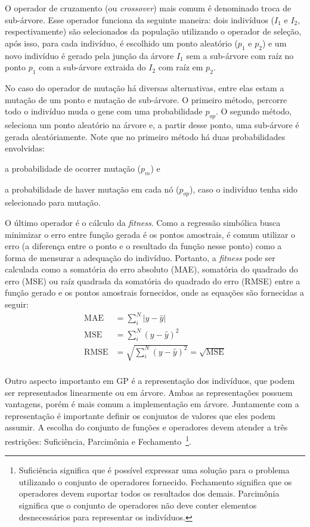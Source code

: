 \documentclass[a4paper]{paper}
\begin{document}
O operador de cruzamento (ou \textit{crossover}) mais comum é denominado troca
de sub-árvore. Esse operador funciona da seguinte maneira: dois indivíduos
($I_1$ e $I_2$, respectivamente) são selecionados da população utilizando o
operador de seleção, após isso, para cada indivíduo, é escolhido um ponto
aleatório ($p_1$ e $p_2$) e um novo indivíduo é gerado pela junção da árvore
$I_1$ sem a sub-árvore com raíz no ponto $p_1$ com a sub-árvore extraida do
$I_2$ com raíz em $p_2$.

No caso do operador de mutação há diversas alternativas, entre elas estam a
mutação de um ponto e mutação de sub-árvore. O primeiro método, percorre todo o
indivíduo muda o gene com uma probabilidade $p_{op}$. O segundo método, seleciona
um ponto aleatório na árvore e, a partir desse ponto, uma sub-árvore é gerada
aleatóriamente. Note que no primeiro método há duas probabilidades envolvidas:
\begin{ilist}
\item a probabilidade de ocorrer mutação ($p_m$) e
\item a probabilidade de haver mutação em cada nó ($p_{op}$), caso o indivíduo
  tenha sido selecionado para mutação.
\end{ilist}

O último operador é o cálculo da \textit{fitness}. Como a regressão simbólica
busca minimizar o erro entre função gerada é os pontos amostrais, é comum
utilizar o erro (a diferença entre o ponto e o resultado da função nesse ponto)
como a forma de mensurar a adequação do indivíduo. Portanto, a \textit{fitness}
pode ser calculada como a somatória do erro absoluto (MAE), somatória do
quadrado do erro (MSE) ou raíz quadrada da somatória do quadrado do erro (RMSE)
entre a função gerado e os pontos amostrais fornecidos, onde as equações são
fornecidas a seguir:
\begin{align*}
  \textrm{MAE} &= \sum_{i}^{N}|y-\hat{y}| \\
  \textrm{MSE} &= \sum_{i}^{N}(y-\hat{y})^2 \\
  \textrm{RMSE} &= \sqrt{\sum_{i}^{N}(y-\hat{y})^2} = \sqrt{\textrm{MSE}}\\
\end{align*}

Outro aspecto importanto em GP é a representação dos indivíduos, que podem ser
representados linearmente ou em árvore. Ambas as representações possuem
vantagens, porém é mais comum a implementação em árvore. Juntamente com a
representação é importante definir os conjuntos de valores que eles podem
assumir. A escolha do conjunto de funções e operadores devem atender a três
restrições: Suficiência, Parcimônia e Fechamento~\footnote{Suficiência significa
que é possível expressar uma solução para o problema utilizando o conjunto de
operadores fornecido. Fechamento significa que os operadores devem suportar
todos os resultados dos demais. Parcimônia significa que o conjunto de
operadores não deve conter elementos desnecessários para representar os
indivíduos.}.
\end{document}
